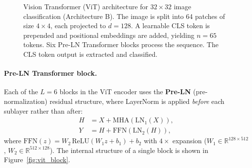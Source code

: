\documentclass[12pt, a4paper]{article}
\begin{document}
\begin{figure}[H]
{%
}
\caption{Vision Transformer (ViT) architecture for $32 \times 32$ image
classification (Architecture B). The image is split into 64 patches
of size $4 \times 4$, each projected to $d = 128$. A learnable CLS
token is prepended and positional embeddings are added, yielding
$n = 65$ tokens. Six Pre-LN Transformer blocks process the sequence.
The CLS token output is extracted and classified.}
\label{fig:vit_arch}
\end{figure}

\paragraph{Pre-LN Transformer block.}
Each of the $L = 6$ blocks in the ViT encoder uses the \textbf{Pre-LN}
(pre-normalization) residual structure, where LayerNorm is applied
\textit{before} each sublayer rather than after:
\begin{align}
    H &= X + \text{MHA}(\text{LN}_1(X)),
    \label{eq:vit_preln_mha} \\
    Y &= H + \text{FFN}(\text{LN}_2(H)),
    \label{eq:vit_preln_ffn}
\end{align}
where $\text{FFN}(z) = W_2\, \text{ReLU}(W_1 z + b_1) + b_2$ with
$4\times$ expansion ($W_1 \in \mathbb{R}^{128 \times 512}$,
$W_2 \in \mathbb{R}^{512 \times 128}$). The internal structure of a
single block is shown in Figure~\ref{fig:vit_block}.
\end{document}
